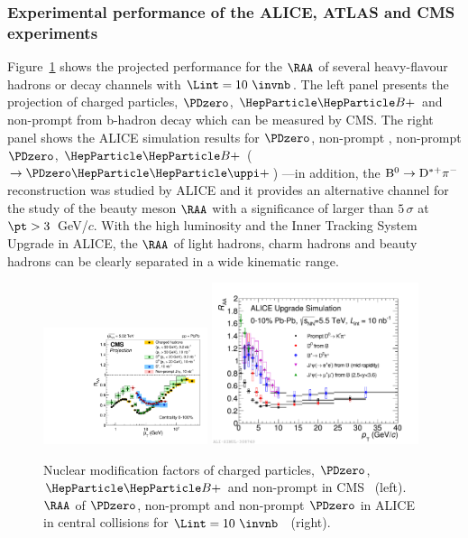
\subsubsection{Experimental performance of the ALICE, ATLAS and CMS experiments}
\label{sec:HFRAAv2}

Figure~\ref{fig:RAAv2.RAA} shows the projected performance for the $\RAA$ of several heavy-flavour hadrons or decay channels with $\Lint=10~\invnb$. The left panel presents the projection of charged particles, $\PDzero$, $\PBp$ and non-prompt \PJGy from b-hadron decay which can be measured by CMS. The right panel shows the ALICE simulation results for $\PDzero$, non-prompt \PJGy, non-prompt $\PDzero$, $\PBp$ ($\rightarrow \PDzero \PGpp$) 
---in addition, the $\rm B^0\rightarrow D^{*+}\pi^-$ reconstruction was studied by ALICE and it provides an alternative channel for the study of the beauty meson $\RAA$ with a significance of larger than $5\,\sigma$ at $\pt > 3$~GeV/$c$. With the high luminosity and the Inner Tracking System Upgrade in ALICE, the $\RAA$ of light hadrons, charm hadrons and beauty hadrons can be clearly separated in a wide kinematic range.

\begin{figure}[ht]
  \begin{center}
    \includegraphics[width=0.43\textwidth]{hf/figures/cRAA_lumiTG_10_lumiMB_0_v2_right.pdf}
   \includegraphics[width=0.54\textwidth]{hf/figures/ALICEUpgrade_charmbeautyRAA.pdf}
    \caption{Nuclear modification factors of charged particles, $\PDzero$, $\PBp$ and non-prompt \PJGy in CMS~\cite{CMS-PAS-FTR-17-002} (left). $\RAA$ of $\PDzero$, non-prompt \PJGy and non-prompt $\PDzero$ in ALICE in central \PbPb collisions for $\Lint=10~\invnb$~\cite{Abelev:1625842} (right).}
    \label{fig:RAAv2.RAA}
  \end{center}
\end{figure}



